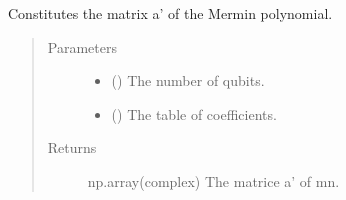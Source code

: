 \documentclass[letterpaper,10pt,english]{sphinxmanual}
\begin{document}
\begin{fulllineitems}
\label{\detokenize{mermin_polynomials-opti:mermin_on_qiskit.hypergraphstates_optimization.mermin_polynomials.a_prime_matrix}}
Constitutes the matrix a’ of the Mermin polynomial.
\begin{quote}\begin{description}
\item[{Parameters}] \leavevmode\begin{itemize}
\item {} 
 () \textendash{} The number of qubits.

\item {} 
 (\sphinxstyleliteralemphasis{\sphinxupquote{(}}\sphinxstyleliteralemphasis{\sphinxupquote{(}}\sphinxstyleliteralemphasis{\sphinxupquote{)}}\sphinxstyleliteralemphasis{\sphinxupquote{)}}) \textendash{} The table of coefficients.

\end{itemize}

\item[{Returns}] \leavevmode
np.array(complex) \textendash{} The matrice a’ of mn.

\end{description}\end{quote}

\end{fulllineitems}

\end{document}
